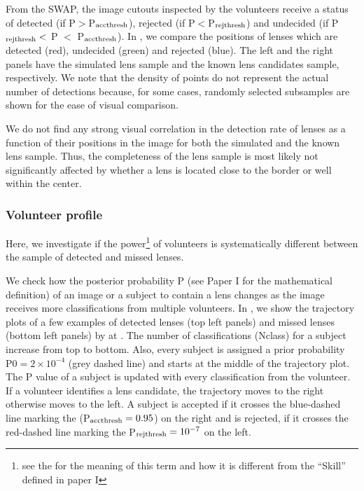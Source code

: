 \documentclass[useAMS,usenatbib,a4paper]{mn2e}
\begin{document}
From the SWAP, the image cutouts inspected by the \sw volunteers receive
a status of detected (if P$>$P$_{\rm acc thresh}$), rejected (if
P$<$P$_{\rm rej thresh}$) and undecided (if P$_{\rm rej thresh}<$ P $<$
P$_{\rm acc thresh}$). In , we compare the positions
of lenses which are detected (red), undecided (green) and rejected
(blue). The left and the right panels have the simulated lens sample and
the known lens candidates sample, respectively. We note that the density
of points do not represent the actual number of detections because, for some
cases, randomly selected subsamples are shown for the ease of visual
comparison.

We do not find any strong visual correlation in the detection rate of
lenses as a function of their positions in the image for both the
simulated and the known lens sample. Thus, the completeness of the lens
sample is most likely not significantly affected by whether a lens is
located close to the border or well within the center.

\subsubsection{Volunteer profile}

Here, we investigate if the power\footnote{see the
 for the meaning of this term and how it is
different from the ``Skill'' defined in paper I} of volunteers is systematically
different between the sample of detected and missed lenses.

We check how the posterior probability P (see Paper I for the
mathematical definition) of an image or a subject to contain a lens
changes as the image receives more classifications from multiple
volunteers.  In , we show the trajectory plots of a few
examples of detected lenses (top left panels) and missed lenses (bottom
left panels) by \sw at \StageOne. The number of classifications (Nclass)
for a subject increase from top to bottom.  Also, every subject is
assigned a prior probability P0$=2\times10^{-4}$ (grey dashed line) and
starts at the middle of the trajectory plot. The P value of a subject is
updated with every classification from the volunteer.  If a volunteer
identifies a lens candidate, the trajectory moves to the right otherwise
moves to the left. A subject is accepted if it crosses the blue-dashed
line marking the (P$_{\rm acc thresh}=0.95$) on the right and is
rejected, if it crosses the red-dashed line marking the P$_{\rm rej
thresh}=10^{-7}$ on the left.
\end{document}
